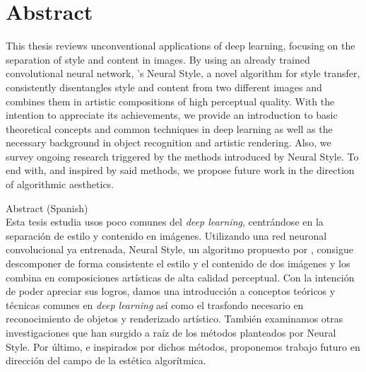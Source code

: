 
\chapter*{Abstract}
\vspace*{-10mm}

This thesis reviews unconventional applications of deep learning, focusing on the separation of style and content in images.
By using an already trained convolutional neural network, \citeauthor{Gatys2015B}'s Neural Style, a novel algorithm for style transfer, consistently disentangles style and content from two different images and combines them in artistic compositions of high perceptual quality.
With the intention to appreciate its achievements, we provide an introduction to basic theoretical concepts and common techniques in deep learning as well as the necessary background in object recognition and artistic rendering.
Also, we survey ongoing research triggered by the methods introduced by Neural Style.
To end with, and inspired by said methods, we propose future work in the direction of algorithmic aesthetics.


\vspace*{20mm}
{Abstract (Spanish)} \\

Esta tesis estudia usos poco comunes del \emph{deep learning}, centrándose en la separación de estilo y contenido en imágenes.
Utilizando una red neuronal convolucional ya entrenada, Neural Style, un algoritmo propuesto por \citeauthor{Gatys2015B}, consigue descomponer de forma consistente el estilo y el contenido de dos imágenes y los combina en composiciones artísticas de alta calidad perceptual.
Con la intención de poder apreciar sus logros, damos una introducción a conceptos teóricos y técnicas comunes en \emph{deep learning} así como el trasfondo necesario en reconocimiento de objetos y renderizado artístico.
También examinamos otras investigaciones que han surgido a raíz de los métodos planteados por Neural Style.
Por último, e inspirados por dichos métodos, proponemos trabajo futuro en dirección del campo de la estética algorítmica.

